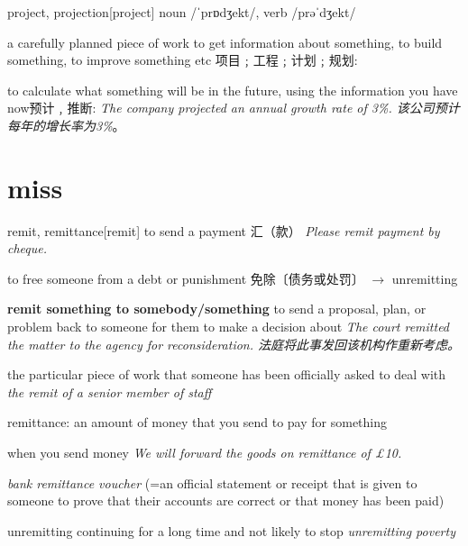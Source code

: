 \begin{DefWord}{project, projection}[project]
noun  /ˈprɒdʒekt/, verb /prəˈdʒekt/

a carefully planned piece of work to get information about something, to build something, to improve something etc 项目﹔工程﹔计划﹔规划:

to calculate what something will be in the future, using the information you have now预计﹐推断:
 \textit{The company projected an annual growth rate of 3\%. 该公司预计每年的增长率为3\%}。

\end{DefWord}









\section{miss}

\begin{DefWord}{remit, remittance}[remit]
    to send a payment 汇（款）
    \textit{Please remit payment by cheque.}

    to free someone from a debt or punishment 免除〔债务或处罚〕 $\rightarrow$  unremitting

    \textbf{remit something to somebody/something}
    to send a proposal, plan, or problem back to someone for them to make a decision about
    \textit{The court remitted the matter to the agency for reconsideration. 法庭将此事发回该机构作重新考虑。}

    the particular piece of work that someone has been officially asked to deal with
    \textit{the remit of a senior member of staff}

    remittance: an amount of money that you send to pay for something

    when you send money
    \textit{We will forward the goods on remittance of £10.}

    \textit{bank remittance voucher} (=an official statement or receipt that is given to someone to prove that their accounts are correct or that money has been paid)
\end{DefWord}

\begin{DefWord}{unremitting}
    continuing for a long time and not likely to stop
    \textit{unremitting poverty}
\end{DefWord}


